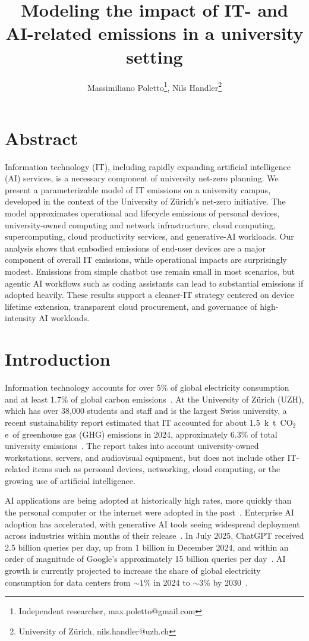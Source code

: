 \documentclass[11pt]{article}
\title{Modeling the impact of IT- and AI-related emissions in a university setting}
\author{Massimiliano Poletto\thanks{Independent researcher, max.poletto@gmail.com}, Nils Handler\thanks{University of Zürich, nils.handler@uzh.ch}}
\let\cite\parencite
\newcommand{\coe}{CO$_2$e}
\newcommand{\tcoe}{t~\coe}
\newcommand{\ktcoe}{k~\tcoe}
\begin{document}
\maketitle

\section*{Abstract}
Information technology (IT), including rapidly expanding artificial intelligence
(AI) services, is a necessary component of university net-zero planning. We
present a parameterizable model of IT emissions on a university campus,
developed in the context of the University of Zürich's net-zero initiative. The
model approximates operational and lifecycle emissions of personal devices,
university-owned computing and network infrastructure, cloud computing,
supercomputing, cloud productivity services, and generative-AI workloads. Our
analysis shows that embodied emissions of end-user devices are a major component
of overall IT emissions, while operational impacts are surprisingly modest.
Emissions from simple chatbot use remain small in most scenarios, but agentic AI
workflows such as coding assistants can lead to substantial emissions if adopted
heavily. These results support a cleaner-IT strategy centered on device lifetime
extension, transparent cloud procurement, and governance of high-intensity AI
workloads.

\section{Introduction}

Information technology accounts for over 5\% of global electricity consumption
and at least 1.7\% of global carbon emissions~\cite{wb:itu:ict}. At the
University of Zürich (UZH), which has over 38,000 students and staff and is the
largest Swiss university, a recent sustainability report estimated that IT
accounted for about 1.5~\ktcoe\ of greenhouse gas (GHG) emissions in 2024,
approximately 6.3\% of total university
emissions~\cite{uzh:sustainability:report}. The report takes into account
university-owned workstations, servers, and audiovisual equipment, but does not
include other IT-related items such as personal devices, networking, cloud
computing, or the growing use of artificial intelligence.

AI applications are being adopted at historically high rates, more quickly than
the personal computer or the internet were adopted in the
past~\cite{bick:ai:adoption}. Enterprise AI adoption has accelerated, with
generative AI tools seeing widespread deployment across industries within months
of their release~\cite{mckinsey2024ai}. In July 2025, ChatGPT received 2.5
billion queries per day, up from 1 billion in December 2024, and within an order
of magnitude of Google's approximately 15 billion queries per
day~\cite{techcrunch:chatgpt}. AI growth is currently projected to increase the
share of global electricity consumption for data centers from $\sim 1\%$ in 2024
to $\sim 3\%$ by 2030~\cite{iea:ai:energy,iea:keyquestions:ai}.
\end{document}
